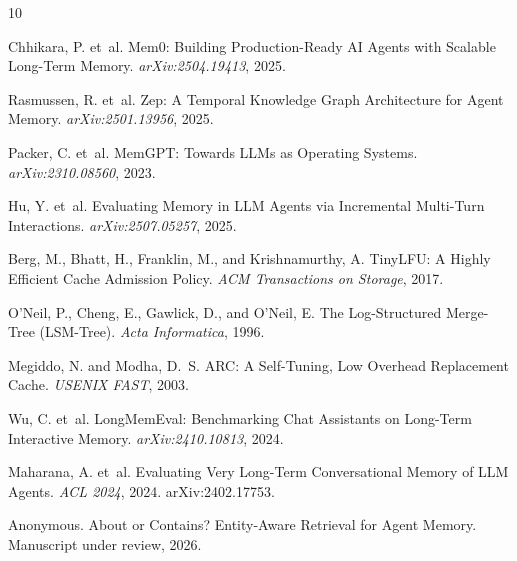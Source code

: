 \documentclass[11pt]{article}
\begin{document}
\begin{thebibliography}{10}

Chhikara, P. et~al.
\newblock Mem0: Building Production-Ready AI Agents with Scalable Long-Term Memory.
\newblock \emph{arXiv:2504.19413}, 2025.

Rasmussen, R. et~al.
\newblock Zep: A Temporal Knowledge Graph Architecture for Agent Memory.
\newblock \emph{arXiv:2501.13956}, 2025.

Packer, C. et~al.
\newblock MemGPT: Towards LLMs as Operating Systems.
\newblock \emph{arXiv:2310.08560}, 2023.

Hu, Y. et~al.
\newblock Evaluating Memory in LLM Agents via Incremental Multi-Turn Interactions.
\newblock \emph{arXiv:2507.05257}, 2025.

Berg, M., Bhatt, H., Franklin, M., and Krishnamurthy, A.
\newblock TinyLFU: A Highly Efficient Cache Admission Policy.
\newblock \emph{ACM Transactions on Storage}, 2017.

O'Neil, P., Cheng, E., Gawlick, D., and O'Neil, E.
\newblock The Log-Structured Merge-Tree (LSM-Tree).
\newblock \emph{Acta Informatica}, 1996.

Megiddo, N. and Modha, D.~S.
\newblock ARC: A Self-Tuning, Low Overhead Replacement Cache.
\newblock \emph{USENIX FAST}, 2003.

Wu, C. et~al.
\newblock LongMemEval: Benchmarking Chat Assistants on Long-Term Interactive Memory.
\newblock \emph{arXiv:2410.10813}, 2024.

Maharana, A. et~al.
\newblock Evaluating Very Long-Term Conversational Memory of LLM Agents.
\newblock \emph{ACL 2024}, 2024. arXiv:2402.17753.

Anonymous.
\newblock About or Contains? Entity-Aware Retrieval for Agent Memory.
\newblock Manuscript under review, 2026.
\end{thebibliography}
\end{document}
